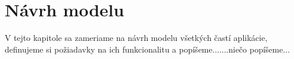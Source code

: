 \chapter{Návrh modelu}\label{chap:proposal}

V tejto kapitole sa zameriame na návrh modelu všetkých častí aplikácie, definujeme si požiadavky na ich funkcionalitu a popíšeme.......niečo popíšeme...